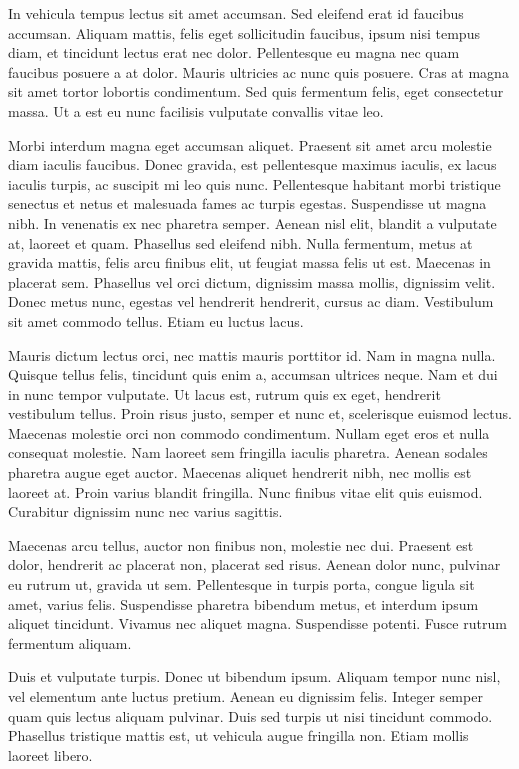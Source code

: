\documentclass[
]{book}
\begin{document}
In vehicula tempus lectus sit amet accumsan. Sed eleifend erat id faucibus accumsan. Aliquam mattis, felis eget sollicitudin faucibus, ipsum nisi tempus diam, et tincidunt lectus erat nec dolor. Pellentesque eu magna nec quam faucibus posuere a at dolor. Mauris ultricies ac nunc quis posuere. Cras at magna sit amet tortor lobortis condimentum. Sed quis fermentum felis, eget consectetur massa. Ut a est eu nunc facilisis vulputate convallis vitae leo.

Morbi interdum magna eget accumsan aliquet. Praesent sit amet arcu molestie diam iaculis faucibus. Donec gravida, est pellentesque maximus iaculis, ex lacus iaculis turpis, ac suscipit mi leo quis nunc. Pellentesque habitant morbi tristique senectus et netus et malesuada fames ac turpis egestas. Suspendisse ut magna nibh. In venenatis ex nec pharetra semper. Aenean nisl elit, blandit a vulputate at, laoreet et quam. Phasellus sed eleifend nibh. Nulla fermentum, metus at gravida mattis, felis arcu finibus elit, ut feugiat massa felis ut est. Maecenas in placerat sem. Phasellus vel orci dictum, dignissim massa mollis, dignissim velit. Donec metus nunc, egestas vel hendrerit hendrerit, cursus ac diam. Vestibulum sit amet commodo tellus. Etiam eu luctus lacus.

Mauris dictum lectus orci, nec mattis mauris porttitor id. Nam in magna nulla. Quisque tellus felis, tincidunt quis enim a, accumsan ultrices neque. Nam et dui in nunc tempor vulputate. Ut lacus est, rutrum quis ex eget, hendrerit vestibulum tellus. Proin risus justo, semper et nunc et, scelerisque euismod lectus. Maecenas molestie orci non commodo condimentum. Nullam eget eros et nulla consequat molestie. Nam laoreet sem fringilla iaculis pharetra. Aenean sodales pharetra augue eget auctor. Maecenas aliquet hendrerit nibh, nec mollis est laoreet at. Proin varius blandit fringilla. Nunc finibus vitae elit quis euismod. Curabitur dignissim nunc nec varius sagittis.

Maecenas arcu tellus, auctor non finibus non, molestie nec dui. Praesent est dolor, hendrerit ac placerat non, placerat sed risus. Aenean dolor nunc, pulvinar eu rutrum ut, gravida ut sem. Pellentesque in turpis porta, congue ligula sit amet, varius felis. Suspendisse pharetra bibendum metus, et interdum ipsum aliquet tincidunt. Vivamus nec aliquet magna. Suspendisse potenti. Fusce rutrum fermentum aliquam.

Duis et vulputate turpis. Donec ut bibendum ipsum. Aliquam tempor nunc nisl, vel elementum ante luctus pretium. Aenean eu dignissim felis. Integer semper quam quis lectus aliquam pulvinar. Duis sed turpis ut nisi tincidunt commodo. Phasellus tristique mattis est, ut vehicula augue fringilla non. Etiam mollis laoreet libero.
\end{document}
